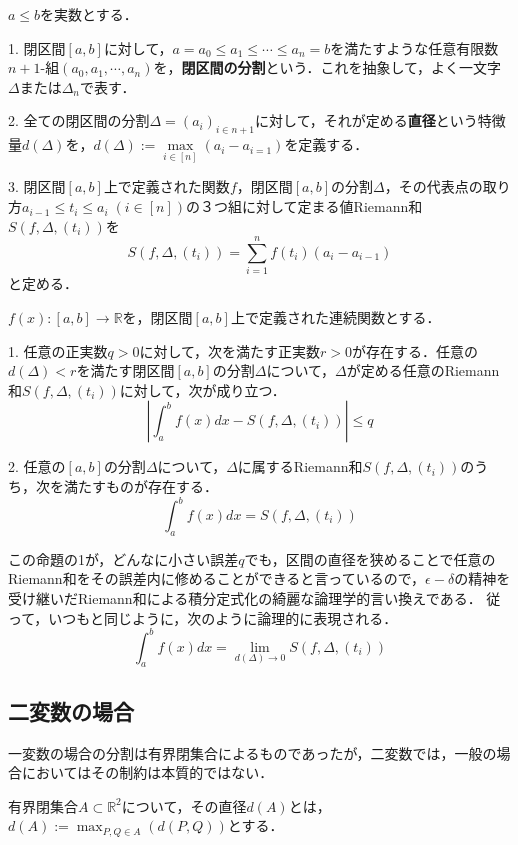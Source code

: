 \documentclass[uplatex, dvipdfmx]{jsreport}
\begin{document}
\begin{definition}
    $a\le b$を実数とする．

    1. 閉区間$[a,b]$に対して，$a=a_0\le a_1\le\cdots\le a_n=b$を満たすような任意有限数$n+1$-組$(a_0,a_1,\cdots,a_n)$を，\textbf{閉区間の分割}という．これを抽象して，よく一文字$\Delta$または$\Delta_n$で表す．

    2. 全ての閉区間の分割$\Delta=(a_i)_{i\in n+1}$に対して，それが定める\textbf{直径}という特徴量$d(\Delta)$を，$d(\Delta):=\underset{i\in [n]}{\max}(a_i-a_{i=1})$を定義する．

    3. 閉区間$[a,b]$上で定義された関数$f$，閉区間$[a,b]$の分割$\Delta$，その代表点の取り方$a_{i-1}\le t_i\le a_i\;(i\in [n])$の３つ組に対して定まる値Riemann和$S(f,\Delta,(t_i))$を
    \[ S(f,\Delta,(t_i)) = \sum^n_{i=1}f(t_i)(a_i-a_{i-1}) \]
    と定める．
\end{definition}

\begin{proposition}
    $f(x):[a,b]\to\mathbb{R}$を，閉区間$[a,b]$上で定義された連続関数とする．

    1. 任意の正実数$q>0$に対して，次を満たす正実数$r>0$が存在する．任意の$d(\Delta)<r$を満たす閉区間$[a,b]$の分割$\Delta$について，$\Delta$が定める任意のRiemann和$S(f,\Delta,(t_i))$に対して，次が成り立つ．
    \[ \left| \int^b_a f(x)dx - S(f,\Delta,(t_i)) \right| \le q \]

    2. 任意の$[a,b]$の分割$\Delta$について，$\Delta$に属するRiemann和$S(f,\Delta,(t_i))$のうち，次を満たすものが存在する．
    \[ \int^b_af(x)dx = S(f,\Delta,(t_i)) \]
\end{proposition}
\begin{remark*}
    この命題の1が，どんなに小さい誤差$q$でも，区間の直径を狭めることで任意のRiemann和をその誤差内に修めることができると言っているので，$\epsilon-\delta$の精神を受け継いだRiemann和による積分定式化の綺麗な論理学的言い換えである．
    従って，いつもと同じように，次のように論理的に表現される．
    \[ \int^b_a f(x)dx = \lim_{d(\Delta)\to 0} S(f,\Delta,(t_i)) \]
\end{remark*}

\subsection{二変数の場合}
一変数の場合の分割は有界閉集合によるものであったが，二変数では，一般の場合においてはその制約は本質的ではない．

\begin{definition*}
    有界閉集合$A\subset \mathbb{R}^2$について，その直径$d(A)$とは，$d(A):=\max_{P,Q\in A}(d(P,Q))$とする．
\end{definition*}
\end{document}
